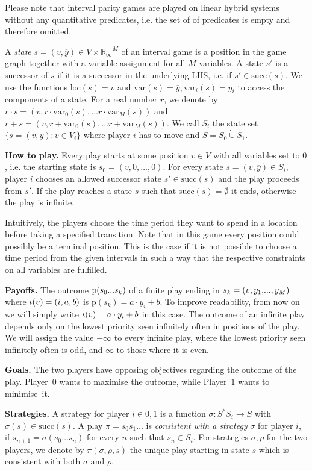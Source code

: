 \documentclass[fleqn,envcountsame]{LMCS}
\newcommand{\ie}{i.e.\xspace}
\newcommand{\pzero}{Player~$0$\xspace}
\newcommand{\pone}{Player~$1$\xspace}
\newcommand{\Rinf}{\ensuremath{\mathbb{R}_{\infty}}}
\newcommand{\ol}[1]{\ensuremath{\overline{#1}}}
\newcommand{\successor}{\ensuremath{\mathrm{succ}}}
\newcommand{\strat}{\ensuremath{\sigma}} \newcommand{\pay}{\ensuremath{\mathrm{p}}} \newcommand{\di}{\ensuremath{\mathrm{d}}} \newcommand{\dih}{\ensuremath{\mathrm{d^*}}}
\newcommand{\loc}{\ensuremath{\mathrm{loc}}} \newcommand{\var}{\ensuremath{\mathrm{var}}} \renewcommand\epsilon{\varepsilon}
\newcommand{\cupdot}{\mathbin{\dot{\cup}}}
\newcommand{\closedots}{\mathinner{\!\ldotp\!\ldotp\!\ldotp\!}}
\begin{document}
Please note that interval parity games are played on linear hybrid systems without any quantitative predicates,
\ie the set of of predicates is empty and therefore omitted.

A \emph{state} $s=(v, \ol{y}) \in V \times \Rinf^M$ of an interval game
is a position in the game graph together with a variable assignment for
all $M$ variables. 
A state $s'$ is a successor of $s$ if it is a successor
in the underlying LHS, \ie if $s' \in \successor(s)$.
We use the functions $\loc(s)=v$ and $\var(s)=\ol{y}, \var_i(s)=y_i$ to 
access the components of a state.
For a real number $r$, we denote by $r \cdot s=(v, r \cdot \var_0(s), \ldots 
r \cdot \var_M(s))$ and  $r + s=(v, r + \var_0(s), \ldots r + \var_M(s)).$
We call $S_i$ the state set $\{s=(v, \ol{y}) : v \in V_i \}$ where player $i$
has to move and $S = S_0 \cupdot S_1$.

\textbf{How to play.}
Every play starts at some position $v \in V$ with all variables set to $0$,
\ie the starting state is $s_0=(v, 0, \ldots, 0)$.
For every state $s = (v, \ol{y}) \in S_i$, player $i$
chooses an allowed successor state $s' \in \successor(s)$ and the play
proceeds from $s'$. If the play reaches a state $s$ such that
$\successor(s) = \emptyset$ it ends, otherwise the play is infinite.

Intuitively, the players choose the time period they want to spend
in a location before taking a specified transition.
Note that in this game every position could possibly be a terminal
position. This is the case if it is not possible to choose a time period
from the given intervals in such a way that the respective constraints
on all variables are fulfilled.

\textbf{Payoffs.}
The outcome $\pay(s_0 \closedots s_k)$ of a finite play ending in 
$s_k=(v, y_1, \closedots, y_M)$ where $\iota(v) = (i, a, b)$ is
$\pay(s_k)= a \cdot y_i + b$.
To improve readability, from now on we will simply write 
$\iota(v) = a \cdot y_i + b$ in this case.
The outcome of an infinite play depends only on the lowest priority seen
infinitely often in positions of the play. We will assign the value
$- \infty$ to every infinite play, where the lowest priority seen infinitely
often is odd, and $\infty$ to those where it is even.


\textbf{Goals.}
The two players have opposing objectives regarding the outcome of the play.
\pzero wants to maximise the outcome, while \pone wants to minimise~it.

\textbf{Strategies.} 
A strategy for player $i \in {0,1}$ is a function
$\strat : S^*S_i \to S$ with $\strat(s) \in \successor(s)$.
A play $\pi = s_0 s_1 \ldots$ is \emph{consistent with a strategy} $\strat$
for player $i$, if $s_{n+1}=\strat(s_0\ldots s_n)$ for every $n$ such that
$s_n\in S_i$.
For strategies $\sigma, \rho$ for the two players, 
we denote by $\pi(\sigma, \rho,s)$ the unique
play starting in state $s$ which is consistent with both $\sigma$ and
$\rho$.
\end{document}
